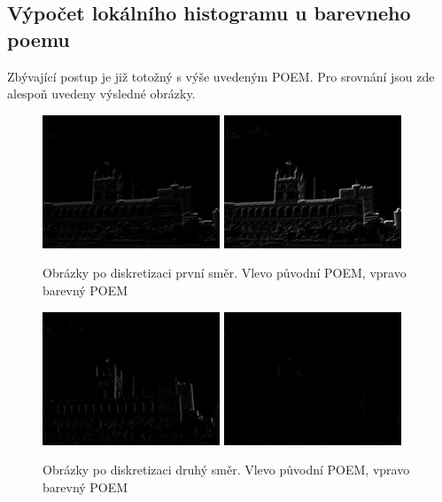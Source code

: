 \documentclass{report}
\begin{document}
\subsection{Výpočet lokálního histogramu u barevneho poemu}
Zbývající postup je již totožný s výše uvedeným POEM. Pro srovnání jsou zde alespoň uvedeny výsledné obrázky. 

\begin{figure}[H]
	\centering
	\includegraphics[width=150pt]{./img/aems0.jpg}
	\includegraphics[width=150pt]{./img/aems_3_0.jpg}
	\caption{Obrázky po diskretizaci první směr. Vlevo původní POEM, vpravo barevný POEM}
\end{figure}
\begin{figure}[H]
	\centering
	\includegraphics[width=150pt]{./img/aems1.jpg}
	\includegraphics[width=150pt]{./img/aems_3_1.jpg}
	\caption{Obrázky po diskretizaci druhý směr. Vlevo původní POEM, vpravo barevný POEM}
\end{figure}
\end{document}
